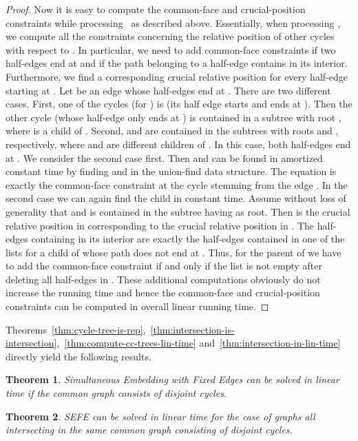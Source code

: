 \documentclass{scrartcl}
\renewcommand{\todo}[1]{}
\newcommand{\1}[1]{{\normalfont \ensuremath{#1^{\tiny\circled{1}}}}} \newcommand{\2}[1]{{\normalfont \ensuremath{#1^{\tiny\circled{2}}}}} \renewcommand{\k}[1]{{\normalfont \ensuremath{#1^{\tiny\circled{k}}}}} \newcommand{\proj}[2]{\ensuremath{\left.#1\right|_{#2}}} \newcommand{\eps}{\varepsilon}
\theoremstyle{plain} \newtheorem{theorem}{Theorem} \newcounter{lemmacounter} \setcounter{lemmacounter}{0} \newtheorem{lemma}[lemmacounter]{Lemma} \newtheorem{fact}{Fact}  \newtheorem{corollary}{Corollary} \theoremstyle{definition} \newtheorem{definition}{Definition}
\begin{document}
\begin{proof}
  Now it is easy to compute the common-face and crucial-position
  constraints while processing~ as described
  above.  Essentially, when processing , we compute all the
  constraints concerning the relative position of other cycles with
  respect to .  In particular, we need to add common-face
  constraints if two half-edges end at  and if the path belonging
  to a half-edge contains  in its interior.  Furthermore, we find a
  corresponding crucial relative position for every half-edge starting
  at .  \todo{Pag 23, lines 21-24:}Let  be an
  edge whose half-edges end at .  There are two different cases.
  First, one of the cycles  (for ) is  (its half
  edge starts and ends at ).  Then the other cycle (whose half-edge
  only ends at ) is contained in a subtree with root , where
   is a child of .  Second,  and  are contained in
  the subtrees with roots  and , respectively, where
   and  are different children of .  In this case, both
  half-edges end at .  We consider the second case first.  Then
   and  can be found in amortized constant time by finding
   and  in the union-find data structure.  The equation
   is exactly the common-face constraint
  at the cycle  stemming from the edge .  In the second case
  we can again find the child  in constant time.  Assume without
  loss of generality that  and  is contained in the
  subtree having  as root.  Then  is the crucial
  relative position in  corresponding to the
  crucial relative position  in .  The half-edges containing  in its interior
  are exactly the half-edges contained in one of the lists 
  for a child  of  whose path does not end at .  Thus, for
  the parent  of  we have to add the common-face constraint
   if and only if the list  is
  not empty after deleting all half-edges in .  These
  additional computations obviously do not increase the running time
  and hence the common-face and crucial-position constraints can be
  computed in overall linear running time.
\end{proof}

Theorems~\ref{thm:cycle-tree-is-rep},~\ref{thm:intersection-is-intersection},~\ref{thm:compute-cc-trees-lin-time}
and~\ref{thm:intersection-in-lin-time} directly yield the following results.

\begin{theorem}
  {\sc Simultaneous Embedding with Fixed Edges} can be solved in
  linear time if the common graph consists of disjoint cycles.
\end{theorem}

\begin{theorem}
  {\sc SEFE} can be solved in linear time for the case of  graphs
   all intersecting in the same common graph 
  consisting of disjoint cycles.
\end{theorem}
\end{document}
